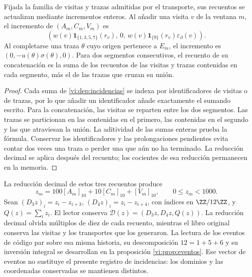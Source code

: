 \begin{proposition}
\label{vi:dep:libro-actualizacion}
Fijada la familia de visitas y trazas admitidas por el transporte, sus
recuentos se actualizan mediante incrementos enteros. Al añadir una
visita \(v\) de la ventana \(m\), el incremento de \((A_m,C_m,V_m)\) es
\[
 \left(w(v)\mathbf1_{\{1,3,5,7\}}(r_v),\,0,\,
 w(v)\mathbf1_{\{9\}}(r_v)\varepsilon_\partial(v)\right).
\]
Al completarse una traza \(\theta\) cuyo origen pertenece a \(E_m\),
el incremento es \((0,-u(\theta)\sigma(\theta),0)\).
Para dos segmentos consecutivos, el recuento de su concatenación es
la suma de los recuentos de las visitas y trazas contenidas en cada
segmento, más el de las trazas que cruzan su unión.
\end{proposition}
\begin{proof}
Cada suma de \eqref{vi:dep:incidencias} se indexa por identificadores
de visitas o de trazas, por lo que añadir un identificador añade
exactamente el sumando escrito. Para la concatenación, las visitas
se reparten entre los dos segmentos. Las trazas se particionan en
las contenidas en el primero, las contenidas en el segundo y las
que atraviesan la unión. La aditividad de las sumas enteras prueba
la fórmula. Conservar los identificadores y las prolongaciones
pendientes evita contar dos veces una traza o perder una que aún
no ha terminado. La reducción decimal se aplica después del
recuento; los cocientes de esa reducción permanecen en la memoria.
\end{proof}

La reducción decimal de estos tres recuentos produce
\begin{equation}
 z_m=100[A_m]_{10}+10[C_m]_{10}+[V_m]_{10},
 \qquad 0\le z_m<1000.
 \label{vi:dep:bloque-incidencial}
\end{equation}
Sean \((D_3z)_i=z_i-z_{i+3}\),
\((D_4z)_i=z_i-z_{i+4}\), con índices en \(\ZZ/12\ZZ\), y
\(Q(z)=\sum_i z_i\). El lector conserva
\(\mathcal D(z)=(D_3z,D_4z,Q(z))\). La reducción decimal olvida
múltiplos de diez de cada recuento, mientras el libro original conserva
las visitas y los transportes que los generaron.
La lectura de los eventos de código par sobre esa misma historia,
su descomposición \(12=1+5+6\) y su inversión integral se
desarrollan en la proposición \ref{vi:prop:eventos}. Ese vector
de eventos no sustituye el presente registro de incidencias:
los dominios y las coordenadas conservadas se mantienen distintos.

